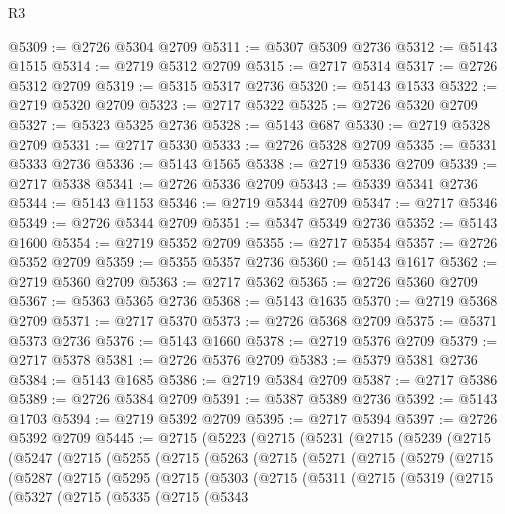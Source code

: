 \begin{lexlean}{R3}
\begin{coremodule}
@5309 := @2726 @5304 @2709
@5311 := @5307 @5309 @2736
@5312 := @5143 @1515
@5314 := @2719 @5312 @2709
@5315 := @2717 @5314
@5317 := @2726 @5312 @2709
@5319 := @5315 @5317 @2736
@5320 := @5143 @1533
@5322 := @2719 @5320 @2709
@5323 := @2717 @5322
@5325 := @2726 @5320 @2709
@5327 := @5323 @5325 @2736
@5328 := @5143 @687
@5330 := @2719 @5328 @2709
@5331 := @2717 @5330
@5333 := @2726 @5328 @2709
@5335 := @5331 @5333 @2736
@5336 := @5143 @1565
@5338 := @2719 @5336 @2709
@5339 := @2717 @5338
@5341 := @2726 @5336 @2709
@5343 := @5339 @5341 @2736
@5344 := @5143 @1153
@5346 := @2719 @5344 @2709
@5347 := @2717 @5346
@5349 := @2726 @5344 @2709
@5351 := @5347 @5349 @2736
@5352 := @5143 @1600
@5354 := @2719 @5352 @2709
@5355 := @2717 @5354
@5357 := @2726 @5352 @2709
@5359 := @5355 @5357 @2736
@5360 := @5143 @1617
@5362 := @2719 @5360 @2709
@5363 := @2717 @5362
@5365 := @2726 @5360 @2709
@5367 := @5363 @5365 @2736
@5368 := @5143 @1635
@5370 := @2719 @5368 @2709
@5371 := @2717 @5370
@5373 := @2726 @5368 @2709
@5375 := @5371 @5373 @2736
@5376 := @5143 @1660
@5378 := @2719 @5376 @2709
@5379 := @2717 @5378
@5381 := @2726 @5376 @2709
@5383 := @5379 @5381 @2736
@5384 := @5143 @1685
@5386 := @2719 @5384 @2709
@5387 := @2717 @5386
@5389 := @2726 @5384 @2709
@5391 := @5387 @5389 @2736
@5392 := @5143 @1703
@5394 := @2719 @5392 @2709
@5395 := @2717 @5394
@5397 := @2726 @5392 @2709
@5445 := @2715
    (@5223
      (@2715
        (@5231
          (@2715
            (@5239
              (@2715
                (@5247
                  (@2715
                    (@5255
                      (@2715
                        (@5263
                          (@2715
                            (@5271
                              (@2715
                                (@5279
                                  (@2715
                                    (@5287
                                      (@2715
                                        (@5295
                                          (@2715
                                            (@5303
                                              (@2715
                                                (@5311
                                                  (@2715
                                                    (@5319
                                                      (@2715
                                                        (@5327
                                                          (@2715
                                                            (@5335
                                                              (@2715
                                                                (@5343

\end{coremodule}
\end{lexlean}
